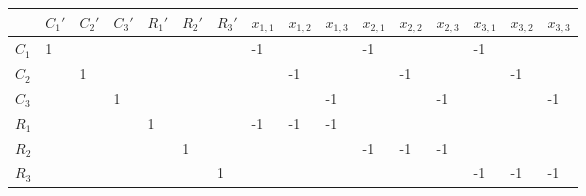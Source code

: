 \begin{table}[]
    \begin{tabular}{|l|l|l|l|l|l|l|l|l|l|l|l|l|l|l|l|}
    \hline
    & $C_1'$ & $C_2'$ & $C_3'$ & $R_1'$ & $R_2'$ & $R_3'$ & $x_{1,1}$ & $x_{1,2}$ & $x_{1,3}$ & $x_{2,1}$ & $x_{2,2}$ & $x_{2,3}$ & $x_{3,1}$ & $x_{3,2}$ & $x_{3,3}$ \\ \hline
    $C_1$ & 1 &&&&&& -1 &&& -1 &&& -1 &&\\ \hline
    $C_2$ && 1 &&&&&& -1 &&& -1 &&& -1 &\\ \hline
    $C_3$ &&& 1 &&&&&& -1 &&& -1 &&& -1 \\ \hline
    $R_1$ &&&& 1 &&& -1 & -1 & -1 &&&&&&\\ \hline
    $R_2$ &&&&& 1 &&&&& -1 & -1 & -1 &&&\\ \hline
    $R_3$ &&&&&& 1 &&&&&&& -1 & -1 & -1 \\ \hline
    \end{tabular}
\end{table}
